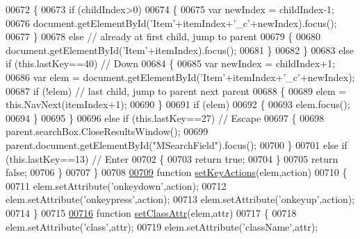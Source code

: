 \begin{DoxyCode}
00672       \{
00673         \textcolor{keywordflow}{if} (childIndex>0)
00674         \{
00675           var newIndex = childIndex-1;
00676           document.getElementById(\textcolor{stringliteral}{'Item'}+itemIndex+\textcolor{stringliteral}{'\_c'}+newIndex).focus();
00677         \}
00678         \textcolor{keywordflow}{else} \textcolor{comment}{// already at first child, jump to parent}
00679         \{
00680           document.getElementById(\textcolor{stringliteral}{'Item'}+itemIndex).focus();
00681         \}
00682       \}
00683       \textcolor{keywordflow}{else} \textcolor{keywordflow}{if} (this.lastKey==40) \textcolor{comment}{// Down}
00684       \{
00685         var newIndex = childIndex+1;
00686         var elem = document.getElementById(\textcolor{stringliteral}{'Item'}+itemIndex+\textcolor{stringliteral}{'\_c'}+newIndex);
00687         \textcolor{keywordflow}{if} (!elem) \textcolor{comment}{// last child, jump to parent next parent}
00688         \{
00689           elem = this.NavNext(itemIndex+1);
00690         \}
00691         \textcolor{keywordflow}{if} (elem)
00692         \{
00693           elem.focus();
00694         \}
00695       \}
00696       \textcolor{keywordflow}{else} \textcolor{keywordflow}{if} (this.lastKey==27) \textcolor{comment}{// Escape}
00697       \{
00698         parent.searchBox.CloseResultsWindow();
00699         parent.document.getElementById(\textcolor{stringliteral}{"MSearchField"}).focus();
00700       \}
00701       \textcolor{keywordflow}{else} \textcolor{keywordflow}{if} (this.lastKey==13) \textcolor{comment}{// Enter}
00702       \{
00703         \textcolor{keywordflow}{return} \textcolor{keyword}{true};
00704       \}
00705       \textcolor{keywordflow}{return} \textcolor{keyword}{false};
00706     \}
00707 \}
00708 
\hypertarget{search_8js_source.tex_l00709}{}\hyperlink{search_8js_a98192fa2929bb8e4b0a890a4909ab9b2}{00709} \textcolor{keyword}{function} \hyperlink{search_8js_a98192fa2929bb8e4b0a890a4909ab9b2}{setKeyActions}(elem,action)
00710 \{
00711   elem.setAttribute(\textcolor{stringliteral}{'onkeydown'},action);
00712   elem.setAttribute(\textcolor{stringliteral}{'onkeypress'},action);
00713   elem.setAttribute(\textcolor{stringliteral}{'onkeyup'},action);
00714 \}
00715 
\hypertarget{search_8js_source.tex_l00716}{}\hyperlink{search_8js_a499422fc054a5278ae32801ec0082c56}{00716} \textcolor{keyword}{function} \hyperlink{search_8js_a499422fc054a5278ae32801ec0082c56}{setClassAttr}(elem,attr)
00717 \{
00718   elem.setAttribute(\textcolor{stringliteral}{'class'},attr);
00719   elem.setAttribute(\textcolor{stringliteral}{'className'},attr);

\end{DoxyCode}
